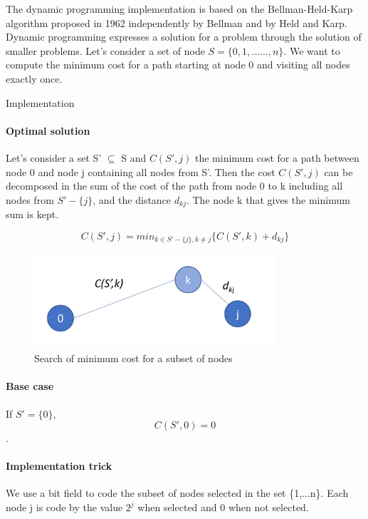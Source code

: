 \documentclass[../report.tex]{subfiles}
\begin{document}
The dynamic programming implementation is based on the Bellman-Held-Karp algorithm  proposed in 1962 independently by Bellman \cite{Bellman1962} and by Held and Karp.
\newline{}
Dynamic programming expresses a solution for a problem through the solution of smaller problems.
\newline{}
Let's consider a set of node $S=\{0,1,......,n\}$. We want to compute the minimum cost for a path starting at node 0 and visiting all nodes exactly once.


\begin{subsection}{Implementation}
\paragraph{Optimal solution}\hfill \break
Let's consider a set S' $\subseteq$ S and $C(S',j)$ the minimum cost for a path between node 0 and node j containing all nodes from S'.
 Then the cost $C(S',j)$ can be decomposed in the sum of the cost 
of the path from node 0 to k including all nodes from $S'-\{j\}$, and the distance $d_{kj}$. The node k that gives the minimum sum is kept.

$$C(S',j)=min_{k \in S'-\{j\}, k \ne j}\{C(S',k)+d_{kj}\}$$

\begin{figure}[H]
\centering
\includegraphics[height=3.5cm,valign=t]{dp_graphalgo.jpg}
\caption{Search of minimum cost for a subset of nodes \label{fig:dpgraphalgo}}
\end{figure}

\paragraph{Base case}\hfill \break
If $S'=\{0\}$, $$C(S',0)=0$$.

\paragraph{Implementation trick}\hfill \break
We use a bit field to code the subset of nodes selected in the set \{1,...n\}.
Each node j is code by the value $2^j$ when selected and 0 when not selected. 
\end{subsection}
\end{document}
